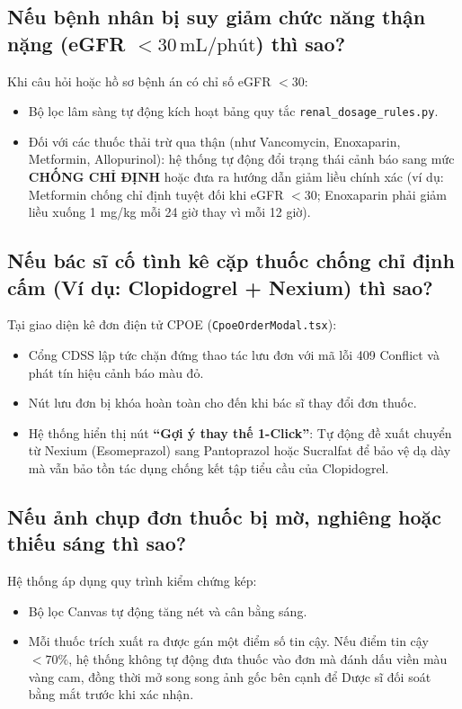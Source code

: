 \documentclass[12pt,a4paper]{article}
\begin{document}
\subsection{Nếu bệnh nhân bị suy giảm chức năng thận nặng (eGFR $< 30\,\text{mL/phút}$) thì sao?}
Khi câu hỏi hoặc hồ sơ bệnh án có chỉ số eGFR $< 30$:
\begin{itemize}[leftmargin=1.5em]
    \item Bộ lọc lâm sàng tự động kích hoạt bảng quy tắc \texttt{renal\_dosage\_rules.py}.
    \item Đối với các thuốc thải trừ qua thận (như Vancomycin, Enoxaparin, Metformin, Allopurinol): hệ thống tự động đổi trạng thái cảnh báo sang mức \textbf{CHỐNG CHỈ ĐỊNH} hoặc đưa ra hướng dẫn giảm liều chính xác (ví dụ: Metformin chống chỉ định tuyệt đối khi eGFR $< 30$; Enoxaparin phải giảm liều xuống 1 mg/kg mỗi 24 giờ thay vì mỗi 12 giờ).
\end{itemize}

\subsection{Nếu bác sĩ cố tình kê cặp thuốc chống chỉ định cấm (Ví dụ: Clopidogrel + Nexium) thì sao?}
Tại giao diện kê đơn điện tử CPOE (\texttt{CpoeOrderModal.tsx}):
\begin{itemize}[leftmargin=1.5em]
    \item Cổng CDSS lập tức chặn đứng thao tác lưu đơn với mã lỗi 409 Conflict và phát tín hiệu cảnh báo màu đỏ.
    \item Nút lưu đơn bị khóa hoàn toàn cho đến khi bác sĩ thay đổi đơn thuốc.
    \item Hệ thống hiển thị nút \textbf{``Gợi ý thay thế 1-Click''}: Tự động đề xuất chuyển từ Nexium (Esomeprazol) sang Pantoprazol hoặc Sucralfat để bảo vệ dạ dày mà vẫn bảo tồn tác dụng chống kết tập tiểu cầu của Clopidogrel.
\end{itemize}

\subsection{Nếu ảnh chụp đơn thuốc bị mờ, nghiêng hoặc thiếu sáng thì sao?}
Hệ thống áp dụng quy trình kiểm chứng kép:
\begin{itemize}[leftmargin=1.5em]
    \item Bộ lọc Canvas tự động tăng nét và cân bằng sáng.
    \item Mỗi thuốc trích xuất ra được gán một điểm số tin cậy. Nếu điểm tin cậy $< 70\%$, hệ thống không tự động đưa thuốc vào đơn mà đánh dấu viền màu vàng cam, đồng thời mở song song ảnh gốc bên cạnh để Dược sĩ đối soát bằng mắt trước khi xác nhận.
\end{itemize}
\end{document}

